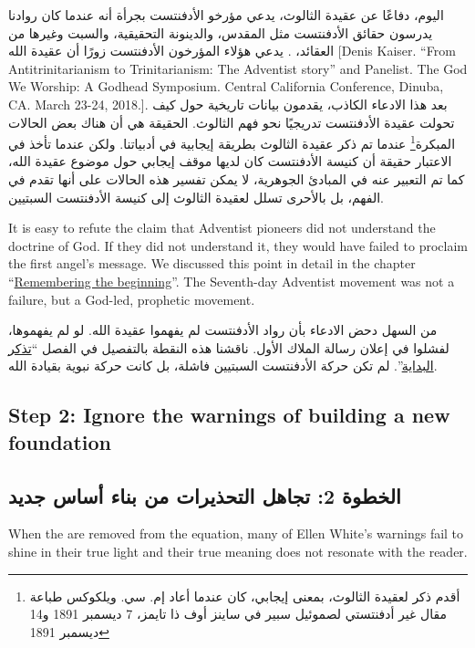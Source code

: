 اليوم، دفاعًا عن عقيدة الثالوث، يدعي مؤرخو الأدفنتست بجرأة أنه عندما كان روادنا يدرسون حقائق الأدفنتست مثل المقدس، والدينونة التحقيقية، والسبت وغيرها من العقائد، . يدعي هؤلاء المؤرخون الأدفنتست زورًا أن عقيدة الله [Denis Kaiser. “From Antitrinitarianism to Trinitarianism: The Adventist story” and Panelist. The God We Worship: A Godhead Symposium. Central California Conference, Dinuba, CA. March 23-24, 2018.]. بعد هذا الادعاء الكاذب، يقدمون بيانات تاريخية حول كيف تحولت عقيدة الأدفنتست تدريجيًا نحو فهم الثالوث. الحقيقة هي أن هناك بعض الحالات المبكرة\footnote{أقدم ذكر لعقيدة الثالوث، بمعنى إيجابي، كان عندما أعاد إم. سي. ويلكوكس طباعة مقال غير أدفنتستي لصموئيل سبير في ساينز أوف ذا تايمز، 7 ديسمبر 1891 و14 ديسمبر 1891} عندما تم ذكر عقيدة الثالوث بطريقة إيجابية في أدبياتنا. ولكن عندما تأخذ في الاعتبار حقيقة أن كنيسة الأدفنتست كان لديها موقف إيجابي حول موضوع عقيدة الله، كما تم التعبير عنه في المبادئ الجوهرية، لا يمكن تفسير هذه الحالات على أنها تقدم في الفهم، بل بالأحرى تسلل لعقيدة الثالوث إلى كنيسة الأدفنتست السبتيين.


It is easy to refute the claim that Adventist pioneers did not understand the doctrine of God. If they did not understand it, they would have failed to proclaim the first angel’s message. We discussed this point in detail in the chapter “\hyperref[chap:remembering-the-beginning]{Remembering the beginning}”. The Seventh-day Adventist movement was not a failure, but a God-led, prophetic movement.


من السهل دحض الادعاء بأن رواد الأدفنتست لم يفهموا عقيدة الله. لو لم يفهموها، لفشلوا في إعلان رسالة الملاك الأول. ناقشنا هذه النقطة بالتفصيل في الفصل “\hyperref[chap:remembering-the-beginning]{تذكر البداية}”. لم تكن حركة الأدفنتست السبتيين فاشلة، بل كانت حركة نبوية بقيادة الله.


\subsection*{Step 2: Ignore the warnings of building a new foundation}


\subsection*{الخطوة 2: تجاهل التحذيرات من بناء أساس جديد}


When the  are removed from the equation, many of Ellen White’s warnings fail to shine in their true light and their true meaning does not resonate with the reader.


